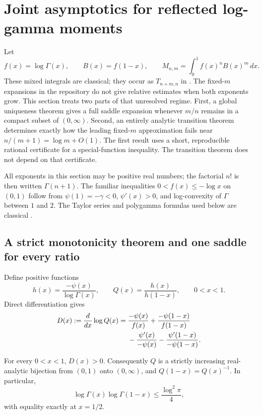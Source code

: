 \section{Joint asymptotics for reflected log-gamma moments}
\label{cont26:joint:sec:main}

Let
\[
 f(x)=\log\Gamma(x),\qquad B(x)=f(1-x),\qquad
 M_{n,m}=\int_0^1 f(x)^n B(x)^m\,dx.
\]
These mixed integrals are classical; they occur as $T_{n+m,n}$ in
\cite[Section~5]{ACEMKM}.  The fixed-$m$ expansions in the
repository do not give relative estimates when both exponents grow.
This section treats two parts of that unresolved regime.  First, a
global uniqueness theorem gives a full saddle expansion whenever
$m/n$ remains in a compact subset of $(0,\infty)$.  Second, an entirely
analytic transition theorem determines exactly how the leading
fixed-$m$ approximation fails near $n/(m+1)=\log m+O(1)$.
The first result uses a short, reproducible rational certificate for a
special-function inequality.  The transition theorem does not depend
on that certificate.

All exponents in this section may be positive real numbers; the
factorial $n!$ is then written $\Gamma(n+1)$.  The familiar inequalities
$0<f(x)\le-\log x$ on $(0,1)$ follow from $\psi(1)=-\gamma<0$,
$\psi'(x)>0$, and log-convexity of $\Gamma$ between $1$ and $2$.
The Taylor series and polygamma formulas used below are classical
\cite{DLMFTaylor,DLMFPolygamma}.

\subsection{A strict monotonicity theorem and one saddle for every ratio}

Define positive functions
\begin{equation}\label{cont26:joint:eq:hQ}
 h(x)=\frac{-\psi(x)}{\log\Gamma(x)},\qquad
 Q(x)=\frac{h(x)}{h(1-x)},\qquad 0<x<1.
\end{equation}
Direct differentiation gives
\begin{align}\label{cont26:joint:eq:D}
 D(x):=\frac{d}{dx}\log Q(x)
 ={}&\frac{-\psi(x)}{f(x)}+
     \frac{-\psi(1-x)}{f(1-x)}\notag\\
 &-\frac{\psi'(x)}{-\psi(x)}-
     \frac{\psi'(1-x)}{-\psi(1-x)}.
\end{align}

\begin{theorem}
\label{cont26:joint:thm:Q}
For every $0<x<1$, $D(x)>0$.  Consequently $Q$ is a strictly increasing
real-analytic bijection from $(0,1)$ onto $(0,\infty)$, and
$Q(1-x)=Q(x)^{-1}$.  In particular,
\begin{equation}\label{cont26:joint:eq:product}
 \log\Gamma(x)\log\Gamma(1-x)
 \le \frac{\log^2\pi}{4},
\end{equation}
with equality exactly at $x=1/2$.
\end{theorem}

